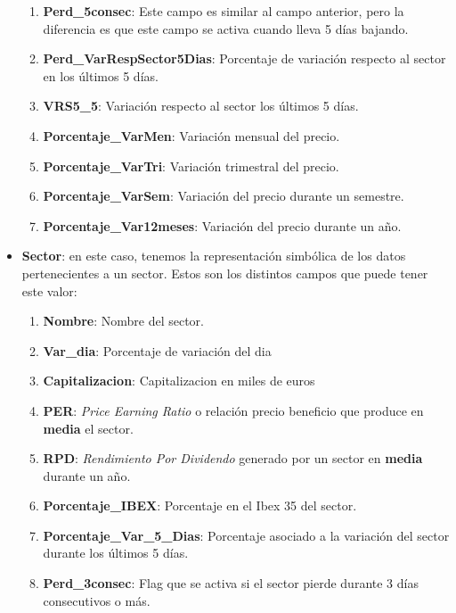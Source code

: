 \documentclass[10pt,spanish]{article}
\theoremstyle{plain}
\theoremstyle{definition}
\begin{document}
\begin{itemize}
\begin{enumerate}[$\diamond$]
        \item \textbf{Perd\_5consec}: Este campo es similar al campo anterior, pero la diferencia es que este campo se activa cuando lleva 5 días bajando.
        \item \textbf{Perd\_VarRespSector5Dias}: Porcentaje de variación respecto al sector en los últimos 5 días.
        \item \textbf{VRS5\_5}: Variación respecto al sector los últimos 5 días.
        \item \textbf{Porcentaje\_VarMen}: Variación mensual del precio.
        \item \textbf{Porcentaje\_VarTri}: Variación trimestral del precio.
        \item \textbf{Porcentaje\_VarSem}: Variación del precio durante un semestre.
        \item \textbf{Porcentaje\_Var12meses}: Variación del precio durante un año.
    \end{enumerate}

    \item \textbf{Sector}: en este caso, tenemos la representación simbólica de los datos pertenecientes a un sector. Estos son los distintos campos que puede tener este valor:
    \begin{enumerate}[$\diamond$]
        \item \textbf{Nombre}: Nombre del sector.
        
        \item \textbf{Var\_dia}: Porcentaje de variación del dia
        
        \item \textbf{Capitalizacion}: Capitalizacion en miles de euros
        
        \item \textbf{PER}: \textit{Price Earning Ratio} o relación precio beneficio que produce en \textbf{media} el sector.
        
        \item \textbf{RPD}: \textit{Rendimiento Por Dividendo} generado por un sector en \textbf{media} durante un año.
        
        \item \textbf{Porcentaje\_IBEX}: Porcentaje en el Ibex 35 del sector.
        
        \item \textbf{Porcentaje\_Var\_5\_Dias}: Porcentaje asociado a la variación del sector durante los últimos 5 días.
        
        \item \textbf{Perd\_3consec}: Flag que se activa si el sector pierde durante 3 días consecutivos o más.
        

\end{enumerate}
\end{itemize}
\end{document}
